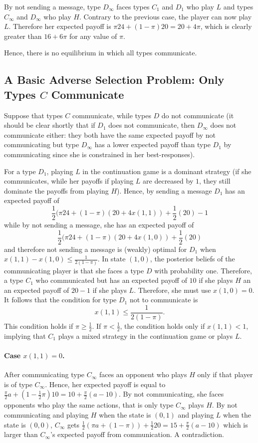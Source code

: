 \documentclass[12pt]{article}
\theoremstyle{definition}
\theoremstyle{remark}
\begin{document}
By not sending a message, type $D_\infty$ faces types $C_1$ and $D_1$ who play $L$ and types $C_\infty$ and $D_\infty$ who play $H$. Contrary to the previous case, the player can now play $L$. Therefore her expected payoff is $\pi 24+(1-\pi)20=20+4\pi$, which is clearly greater than $16+6\pi$ for any value of $\pi$.

Hence, there is no equilibrium in which all types communicate.


\subsection{A Basic Adverse Selection Problem: Only Types $C$ Communicate} Suppose that types $C$ communicate, while types $D$ do not communicate (it should be clear shortly that if $D_1$ does not communicate, then $D_\infty$ does not communicate either: they both have the same expected payoff by not communicating but type $D_\infty$ has a lower expected payoff than type $D_1$ by communicating since she is constrained in her best-responses). 

For a type $D_1$, playing $L$ in the continuation game is a dominant strategy (if she communicates, while her payoffs if playing $L$ are decreased by $1$, they still dominate the payoffs from playing $H$). Hence, by sending a message $D_1$ has an expected payoff of 
\[
\frac{1}{2}(\pi 24 + (1-\pi)(20+4x(1,1))+\frac{1}{2}(20)-1
\]
while by not sending a message, she has an expected payoff of
\[
\frac{1}{2}(\pi 24 + (1-\pi)(20+4x(1,0))+\frac{1}{2}(20)
\]
and therefore not sending a message is (weakly) optimal for $D_1$ when $	x(1,1)-x(1,0)\leq\frac{1}{2(1-\pi)}$.  
%
In state $(1,0)$, the posterior beliefs of the communicating player is that she faces a type $D$ with probability one. Therefore, a type $C_1$ who communicated but has an expected payoff of $10$ if she plays $H$ an an expected payoff of $20-1$ if she plays $L$. Therefore, she must use $x(1,0)=0$. It follows that the condition for type $D_1$ not to communicate is
%
\begin{equation}\label{cond-IC-D1}
	x(1,1)\leq\frac{1}{2(1-\pi)}.
\end{equation}
%
This condition holds if $\pi\geq \frac{1}{2}$. If $\pi<\frac{1}{2}$, the condition holds only if $x(1,1)<1$, implying that $C_1$ plays a mixed strategy in the continuation game or plays $L$.

\paragraph{Case $x(1,1)=0$.} After communicating type $C_\infty$ faces an opponent who plays $H$ only if that player is of type $C_\infty$. Hence, her expected payoff is equal to $\frac{\pi}{2}a + (1-\frac{1}{2}\pi)10=10+\frac{\pi}{2}(a-10)$. By not communicating, she faces opponents who play the same actions, that is only type $C_\infty$ plays $H$. By not communicating and playing $H$ when the state is $(0,1)$ and playing $L$ when the state is $(0,0)$, $C_\infty$ gets $\frac{1}{2}(\pi a + (1-\pi)) + \frac{1}{2} 20 = 15 + \frac{\pi}{2}(a-10)$ which is larger than $C_\infty$'s expected payoff from communication. A contradiction.
\end{document}
